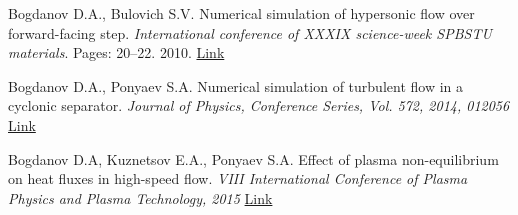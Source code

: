 \documentclass[10pt]{article}
\begin{document}
\begin{bibenum}
    \item Bogdanov D.A., Bulovich S.V. Numerical simulation of hypersonic flow over forward-facing step. \emph{International conference of XXXIX science-week SPBSTU materials}. Pages: 20--22. 2010.
    \href{http://nru.spbstu.ru/scientific_events/week_of_science/week_of_science-2010/physical_sciences/}{Link}
    \item Bogdanov D.A., Ponyaev S.A. Numerical simulation of turbulent flow in a cyclonic separator. \emph{Journal of
    Physics, Conference Series, Vol. 572, 2014, 012056}
    \href{http://iopscience.iop.org/1742-6596/572/1/012056/}{Link}
  \item Bogdanov D.A, Kuznetsov E.A., Ponyaev S.A. Effect of plasma non-equilibrium on heat fluxes in high-speed flow.
    \emph {VIII International Conference of Plasma Physics and Plasma Technology, 2015}
    \href{http://ifanbel.bas-net.by/pppt-8/}{Link}
\end{bibenum}
\vspace{0.1in}
\end{document}
